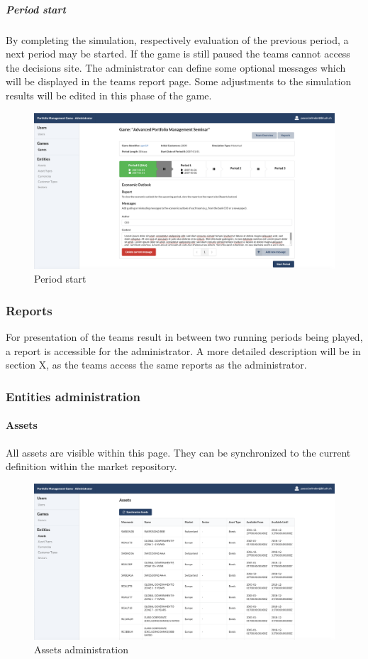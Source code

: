 \subparagraph{Period start}
By completing the simulation, respectively evaluation of the previous period, a next period may be started. If the game is still paused the teams cannot access the decisions site. The administrator can define some optional messages which will be displayed in the teams report page. Some adjustments to the simulation results will be edited in this phase of the game.
\begin{figure}[h!]
  \centering
  \includegraphics[scale=0.2]{img/application-overview/administrator/09_period_start.png}
  \caption{Period start}
\end{figure}

\subsubsection{Reports}
For presentation of the teams result in between two running periods being played, a report is accessible for the administrator. A more detailed description will be in section X, as the teams access the same reports as the administrator.


\subsubsection{Entities administration}

\paragraph{Assets}
All assets are visible within this page. They can be synchronized to the current definition within the market repository. %
\begin{figure}[h!]
  \centering
  \includegraphics[scale=0.2]{img/application-overview/administrator/entities_assets.png}
  \caption{Assets administration}
\end{figure}


